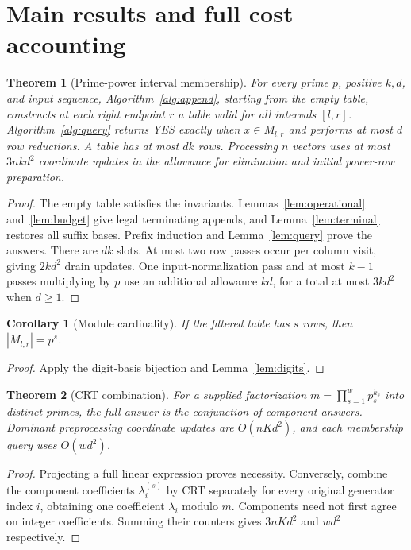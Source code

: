\documentclass[11pt,a4paper]{article}
\theoremstyle{definition}
\theoremstyle{plain}
\newtheorem{theorem}{Theorem}
\newtheorem{corollary}{Corollary}
\begin{document}
\section{Main results and full cost accounting}
\begin{theorem}[Prime-power interval membership]\label{thm:prime}
For every prime $p$, positive $k,d$, and input sequence, Algorithm~\ref{alg:append}, starting from
the empty table, constructs at each right endpoint $r$ a table valid for all intervals $[l,r]$.
Algorithm~\ref{alg:query} returns YES exactly when $x\in M_{l,r}$ and performs at most $d$ row
reductions. A table has at most $dk$ rows. Processing $n$ vectors uses at most $3nkd^2$ coordinate
updates in the allowance for elimination and initial power-row preparation.
\end{theorem}
\begin{proof}
The empty table satisfies the invariants. Lemmas~\ref{lem:operational} and~\ref{lem:budget} give
legal terminating appends, and Lemma~\ref{lem:terminal} restores all suffix bases. Prefix induction
and Lemma~\ref{lem:query} prove the answers. There are $dk$ slots. At most two row passes occur per
column visit, giving $2kd^2$ drain updates. One input-normalization pass and at most $k-1$ passes
multiplying by $p$ use an additional allowance $kd$, for a total at most $3kd^2$ when $d\ge1$.
\end{proof}

\begin{corollary}[Module cardinality]\label{cor:card}
If the filtered table has $s$ rows, then $|M_{l,r}|=p^s$.
\end{corollary}
\begin{proof}
Apply the digit-basis bijection and Lemma~\ref{lem:digits}.
\end{proof}

\begin{theorem}[CRT combination]\label{thm:crt}
For a supplied factorization $m=\prod_{s=1}^w p_s^{k_s}$ into distinct primes, the full answer is
the conjunction of component answers. Dominant preprocessing coordinate updates are $O(nKd^2)$,
and each membership query uses $O(wd^2)$.
\end{theorem}
\begin{proof}
Projecting a full linear expression proves necessity. Conversely, combine the component
coefficients $\lambda_i^{(s)}$ by CRT separately for every original generator index $i$, obtaining
one coefficient $\lambda_i$ modulo $m$. Components need not first agree on integer coefficients.
Summing their counters gives $3nKd^2$ and $wd^2$ respectively.
\end{proof}
\end{document}
